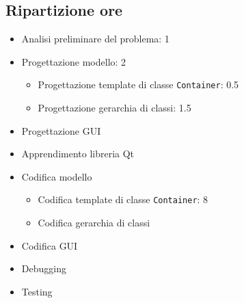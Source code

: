 \documentclass{article}
\begin{document}
\subsection{Ripartizione ore} %
\label{sub:ripartizione_ore}
\begin{itemize}
	\item Analisi preliminare del problema: 1
	\item Progettazione modello: 2
	\begin{itemize}
		\item Progettazione template di classe \verb|Container|: 0.5
		\item Progettazione gerarchia di classi: 1.5
	\end{itemize}
	\item Progettazione GUI
	\item Apprendimento libreria Qt
	\item Codifica modello
	\begin{itemize}
		\item Codifica template di classe \verb|Container|: 8
		\item Codifica gerarchia di classi
	\end{itemize}
	\item Codifica GUI
	\item Debugging
	\item Testing
\end{itemize}
\end{document}
